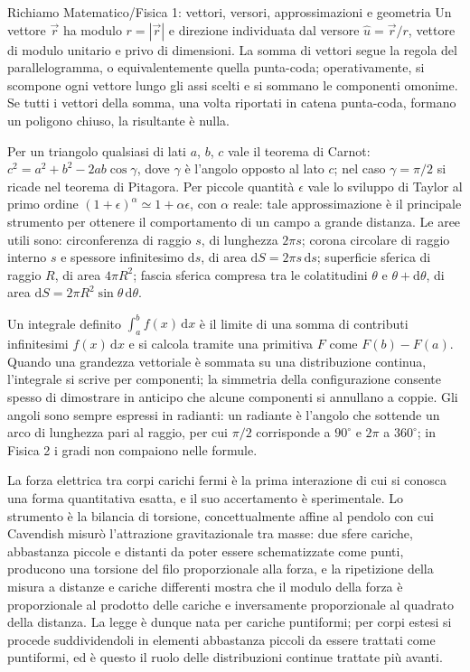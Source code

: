 \documentclass[11pt,a4paper]{article}
\newcommand{\dd}{\mathrm{d}}
\newcommand{\uv}{\hat{u}}
\begin{document}
\begin{richiamo}{Richiamo Matematico/Fisica 1: vettori, versori, approssimazioni e geometria}
Un vettore $\vec r$ ha modulo $r=|\vec r|$ e direzione individuata dal versore $\uv=\vec r/r$, vettore di modulo unitario e privo di dimensioni. La somma di vettori segue la regola del parallelogramma, o equivalentemente quella punta-coda; operativamente, si scompone ogni vettore lungo gli assi scelti e si sommano le componenti omonime. Se tutti i vettori della somma, una volta riportati in catena punta-coda, formano un poligono chiuso, la risultante è nulla.

Per un triangolo qualsiasi di lati $a$, $b$, $c$ vale il teorema di Carnot: $c^2=a^2+b^2-2ab\cos\gamma$, dove $\gamma$ è l'angolo opposto al lato $c$; nel caso $\gamma=\pi/2$ si ricade nel teorema di Pitagora. Per piccole quantità $\epsilon$ vale lo sviluppo di Taylor al primo ordine $(1+\epsilon)^{\alpha}\simeq 1+\alpha\epsilon$, con $\alpha$ reale: tale approssimazione è il principale strumento per ottenere il comportamento di un campo a grande distanza. Le aree utili sono: circonferenza di raggio $s$, di lunghezza $2\pi s$; corona circolare di raggio interno $s$ e spessore infinitesimo $\dd s$, di area $\dd S=2\pi s\,\dd s$; superficie sferica di raggio $R$, di area $4\pi R^2$; fascia sferica compresa tra le colatitudini $\theta$ e $\theta+\dd\theta$, di area $\dd S=2\pi R^2\sin\theta\,\dd\theta$.

Un integrale definito $\int_a^b f(x)\,\dd x$ è il limite di una somma di contributi infinitesimi $f(x)\,\dd x$ e si calcola tramite una primitiva $F$ come $F(b)-F(a)$. Quando una grandezza vettoriale è sommata su una distribuzione continua, l'integrale si scrive per componenti; la simmetria della configurazione consente spesso di dimostrare in anticipo che alcune componenti si annullano a coppie. Gli angoli sono sempre espressi in radianti: un radiante è l'angolo che sottende un arco di lunghezza pari al raggio, per cui $\pi/2$ corrisponde a $90^{\circ}$ e $2\pi$ a $360^{\circ}$; in Fisica 2 i gradi non compaiono nelle formule.
\end{richiamo}

La forza elettrica tra corpi carichi fermi è la prima interazione di cui si conosca una forma quantitativa esatta, e il suo accertamento è sperimentale. Lo strumento è la bilancia di torsione, concettualmente affine al pendolo con cui Cavendish misurò l'attrazione gravitazionale tra masse: due sfere cariche, abbastanza piccole e distanti da poter essere schematizzate come punti, producono una torsione del filo proporzionale alla forza, e la ripetizione della misura a distanze e cariche differenti mostra che il modulo della forza è proporzionale al prodotto delle cariche e inversamente proporzionale al quadrato della distanza. La legge è dunque nata per cariche puntiformi; per corpi estesi si procede suddividendoli in elementi abbastanza piccoli da essere trattati come puntiformi, ed è questo il ruolo delle distribuzioni continue trattate più avanti.
\end{document}
